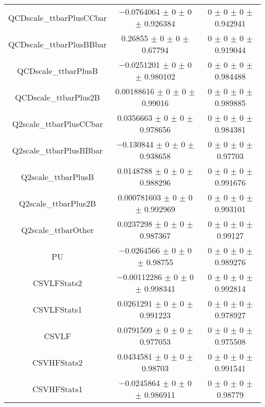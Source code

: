 \begin{table}
\begin{tabular}{ccc}
QCDscale\_ttbarPlusCCbar & \num{-0.0764064} $\pm$ \num{0} $\pm$ \num{0} $\pm$ \num{0.926384} & \num{0} $\pm$ \num{0} $\pm$ \num{0} $\pm$ \num{0.942941}\\
QCDscale\_ttbarPlusBBbar & \num{0.26855} $\pm$ \num{0} $\pm$ \num{0} $\pm$ \num{0.67794} & \num{0} $\pm$ \num{0} $\pm$ \num{0} $\pm$ \num{0.919044}\\
QCDscale\_ttbarPlusB & \num{-0.0251201} $\pm$ \num{0} $\pm$ \num{0} $\pm$ \num{0.980102} & \num{0} $\pm$ \num{0} $\pm$ \num{0} $\pm$ \num{0.984488}\\
QCDscale\_ttbarPlus2B & \num{0.00188616} $\pm$ \num{0} $\pm$ \num{0} $\pm$ \num{0.99016} & \num{0} $\pm$ \num{0} $\pm$ \num{0} $\pm$ \num{0.989885}\\
Q2scale\_ttbarPlusCCbar & \num{0.0356663} $\pm$ \num{0} $\pm$ \num{0} $\pm$ \num{0.978656} & \num{0} $\pm$ \num{0} $\pm$ \num{0} $\pm$ \num{0.984381}\\
Q2scale\_ttbarPlusBBbar & \num{-0.130844} $\pm$ \num{0} $\pm$ \num{0} $\pm$ \num{0.938658} & \num{0} $\pm$ \num{0} $\pm$ \num{0} $\pm$ \num{0.97703}\\
Q2scale\_ttbarPlusB & \num{0.0148788} $\pm$ \num{0} $\pm$ \num{0} $\pm$ \num{0.988296} & \num{0} $\pm$ \num{0} $\pm$ \num{0} $\pm$ \num{0.991676}\\
Q2scale\_ttbarPlus2B & \num{0.000781603} $\pm$ \num{0} $\pm$ \num{0} $\pm$ \num{0.992969} & \num{0} $\pm$ \num{0} $\pm$ \num{0} $\pm$ \num{0.993101}\\
Q2scale\_ttbarOther & \num{0.0237298} $\pm$ \num{0} $\pm$ \num{0} $\pm$ \num{0.987367} & \num{0} $\pm$ \num{0} $\pm$ \num{0} $\pm$ \num{0.99127}\\
PU & \num{-0.0264566} $\pm$ \num{0} $\pm$ \num{0} $\pm$ \num{0.98755} & \num{0} $\pm$ \num{0} $\pm$ \num{0} $\pm$ \num{0.989276}\\
CSVLFStats2 & \num{-0.00112286} $\pm$ \num{0} $\pm$ \num{0} $\pm$ \num{0.998341} & \num{0} $\pm$ \num{0} $\pm$ \num{0} $\pm$ \num{0.992814}\\
CSVLFStats1 & \num{0.0261291} $\pm$ \num{0} $\pm$ \num{0} $\pm$ \num{0.991223} & \num{0} $\pm$ \num{0} $\pm$ \num{0} $\pm$ \num{0.978927}\\
CSVLF & \num{0.0791509} $\pm$ \num{0} $\pm$ \num{0} $\pm$ \num{0.977053} & \num{0} $\pm$ \num{0} $\pm$ \num{0} $\pm$ \num{0.975508}\\
CSVHFStats2 & \num{0.0434581} $\pm$ \num{0} $\pm$ \num{0} $\pm$ \num{0.98703} & \num{0} $\pm$ \num{0} $\pm$ \num{0} $\pm$ \num{0.991541}\\
CSVHFStats1 & \num{-0.0245864} $\pm$ \num{0} $\pm$ \num{0} $\pm$ \num{0.986911} & \num{0} $\pm$ \num{0} $\pm$ \num{0} $\pm$ \num{0.98779}\\

\end{tabular}
\end{table}
